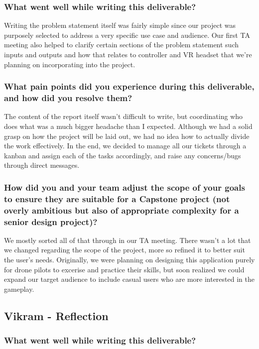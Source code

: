 \documentclass{article}
\begin{document}
\subsubsection*{What went well while writing this deliverable?}

Writing the problem statement itself was fairly simple since our
project was purposely selected to address a very specific use case
and audience. Our first TA meeting also helped to clarify certain sections of
the problem statement such inputs and outputs and how that relates to controller
and VR headset that we're planning on incorporating into the project.

\subsubsection*{What pain points did you experience during this deliverable, and how did you resolve them?}

The content of the report itself wasn't difficult to write, but coordinating who does what was a
much bigger headache than I expected. Although we had a solid grasp on how the project
will be laid out, we had no idea how to actually divide the work effectively. In the end,
we decided to manage all our tickets through a kanban and assign each of the tasks accordingly,
and raise any concerns/bugs through direct messages.

\subsubsection*{How did you and your team adjust the scope of your goals to ensure
    they are suitable for a Capstone project (not overly ambitious but also of
    appropriate complexity for a senior design project)?}

We mostly sorted all of that through in our TA meeting. There wasn't a lot that
we changed regarding the scope of the project, more so refined it to better suit
the user's needs. Originally, we were planning on designing this application purely 
for drone pilots to excerise and practice their skills, but soon realized we could
expand our target audience to include casual users who are more interested in the
gameplay.

\subsection*{Vikram - Reflection}
\subsubsection*{What went well while writing this deliverable?}
\end{document}
